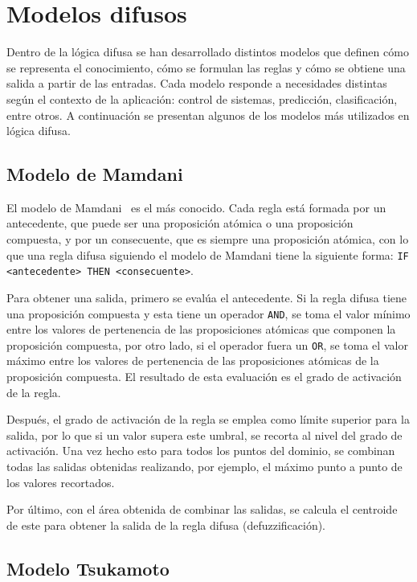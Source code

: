 \section{Modelos difusos}
\label{apx:ModelosDifusos}

Dentro de la lógica difusa se han desarrollado distintos modelos que definen cómo se representa el conocimiento, cómo se formulan las reglas y cómo se obtiene una salida a partir de las entradas. Cada modelo responde a necesidades distintas según el contexto de la aplicación: control de sistemas, predicción, clasificación, entre otros. A continuación se presentan algunos de los modelos más utilizados en lógica difusa.

\subsection{Modelo de Mamdani}
\label{apx:ModeloMamdani}

El modelo de Mamdani~\cite{MAMDANI19751} es el más conocido. Cada regla está formada por un antecedente, que puede ser una proposición atómica o una proposición compuesta, y por un consecuente, que es siempre una proposición atómica, con lo que una regla difusa siguiendo el modelo de Mamdani tiene la siguiente forma: \texttt{IF <antecedente> THEN <consecuente>}.

Para obtener una salida, primero se evalúa el antecedente. Si la regla difusa tiene una proposición compuesta y esta tiene un operador \texttt{AND}, se toma el valor mínimo entre los valores de pertenencia de las proposiciones atómicas que componen la proposición compuesta, por otro lado, si el operador fuera un \texttt{OR}, se toma el valor máximo entre los valores de pertenencia de las proposiciones atómicas de la proposición compuesta. El resultado de esta evaluación es el grado de activación de la regla.

Después, el grado de activación de la regla se emplea como límite superior para la salida, por lo que si un valor supera este umbral, se recorta al nivel del grado de activación. Una vez hecho esto para todos los puntos del dominio, se combinan todas las salidas obtenidas realizando, por ejemplo, el máximo punto a punto de los valores recortados.

Por último, con el área obtenida de combinar las salidas, se calcula el centroide de este para obtener la salida de la regla difusa (defuzzificación). 

\subsection{Modelo Tsukamoto}
\label{apx:ModeloTsukamoto}

